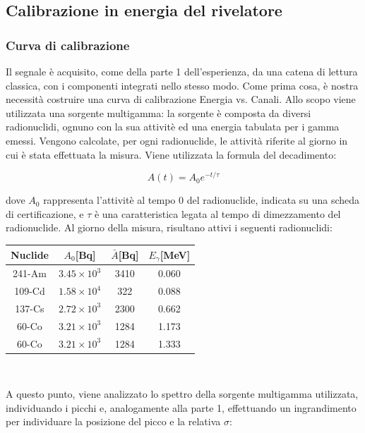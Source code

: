 \documentclass[a4paper,10pt]{article}
\begin{document}
\subsection{Calibrazione in energia del rivelatore}

 
\subsubsection{Curva di calibrazione}
Il segnale \`e acquisito, come della parte 1 dell'esperienza, da una catena di lettura classica, con i componenti integrati nello stesso modo. Come prima cosa, \`e nostra necessit\`a costruire una curva di calibrazione Energia vs. Canali. Allo scopo viene utilizzata una sorgente multigamma: la sorgente \`e composta da diversi radionuclidi, ognuno con la sua attivit\`e ed una energia tabulata per i gamma emessi. Vengono calcolate, per ogni radionuclide, le attività riferite al giorno in cui \`e stata effettuata la misura. Viene utilizzata la formula del decadimento:

\begin{equation}
	A(t)=A_{0}e^{-t/\tau}
\end{equation}

\noindent dove $A_{0}$ rappresenta l'attivit\`e al tempo 0 del radionuclide, indicata su una scheda di certificazione, e $\tau$ \`e una caratteristica legata al tempo di dimezzamento del radionuclide. Al giorno della misura, risultano attivi i seguenti radionuclidi:

\begin{center}
    \begin{tabular}{cccc}
        \toprule
        Nuclide & $A_{0}$[Bq] & $\bar{A}$[Bq] & $E_{\gamma}$[MeV]\\
        \midrule
         241-Am & $3.45 \times 10^3$ & 3410 & 0.060\\
	  109-Cd & $1.58 \times 10^4$ & 322 & 0.088\\
	  137-Cs & $2.72 \times 10^3$ & 2300 & 0.662\\
	  60-Co & $3.21 \times 10^3$ & 1284 & 1.173\\
	  60-Co & $3.21 \times 10^3$ & 1284 & 1.333\\
        \bottomrule
    \end{tabular}\\
\end{center}

\noindent A questo punto, viene analizzato lo spettro della sorgente multigamma utilizzata, individuando i picchi e, analogamente alla parte 1, effettuando un ingrandimento per individuare la posizione del picco e la relativa $\sigma$:
\end{document}
